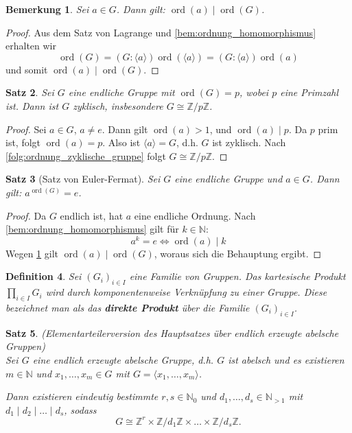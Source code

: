 \documentclass[a4paper, twoside, 11pt, ngerman]{report}
\newcommand{\NN}{\mathds N}
\newcommand{\ZZ}{\mathds Z}
\DeclareMathOperator{\ord}{ord}
\theoremstyle{definistyle}
\newtheorem{satz}{Satz}[section]
\newtheorem{defini}[satz]{Definition}
\newtheorem{bem}[satz]{Bemerkung}
\theoremstyle{remark}
\newcommand{\defn}[1]{\textit{\bfseries #1}}
\begin{document}
\begin{bem}\label{bem:ordnung_teilt_ordG}
Sei $a \in G$. Dann gilt: $\ord(a) \mid \ord(G)$.
\end{bem}

\begin{proof}
Aus dem Satz von Lagrange und \ref{bem:ordnung_homomorphismus} erhalten wir \[\ord(G) = (G : \langle a \rangle) \ord(\langle a\rangle)=(G : \langle a \rangle) \ord(a)\] und somit $\ord(a) \mid \ord(G)$.
\end{proof}

\begin{satz}\label{satz:endliche_zyklische_gruppe}
Sei $G$ eine endliche Gruppe mit $\ord(G) = p$, wobei $p$ eine Primzahl ist. Dann ist $G$ zyklisch, insbesondere $G \cong \ZZ / p \ZZ$.
\end{satz}

\begin{proof}
Sei $a \in G$, $a \neq e$. Dann gilt $\ord(a) > 1$, und $\ord(a) \mid p$. Da $p$ prim ist, folgt $\ord(a) = p$. Also ist $\langle a \rangle = G$, d.h. $G$ ist zyklisch. Nach \ref{folg:ordnung_zyklische_gruppe} folgt $G \cong \ZZ / p \ZZ$.
\end{proof}

\begin{satz}[Satz von Euler-Fermat]\label{satz:euler_fermat}
Sei $G$ eine endliche Gruppe und $a \in G$. Dann gilt: $a^{\ord(G)} = e$.
\end{satz}

\begin{proof}
Da $G$ endlich ist, hat $a$ eine endliche Ordnung. Nach \ref{bem:ordnung_homomorphismus} gilt für $k\in\NN$:
\[
a^k=e\iff \ord(a) \mid k
\]
Wegen \ref{bem:ordnung_teilt_ordG} gilt $\ord(a)\mid \ord(G)$, woraus sich die Behauptung ergibt.
\end{proof}

\begin{defini}\label{defi:produkt_von_gruppen}
Sei $(G_i)_{i \in I}$ eine Familie von Gruppen.
Das kartesische Produkt $\prod_{i \in I} G_i$ wird durch komponentenweise Verknüpfung zu einer Gruppe. 
Diese bezeichnet man als das \defn{direkte Produkt} über die Familie $(G_i)_{i \in I}$.
\end{defini}

\begin{satz}\label{satz:elementarteilersatz}
(Elementarteilerversion des Hauptsatzes über endlich erzeugte abelsche Gruppen) \\
Sei $G$ eine endlich erzeugte abelsche Gruppe, d.h. $G$ ist abelsch und es existieren $m \in \NN$ und $x_1, \dots, x_m \in G$ mit $G = \langle x_1, \dots, x_m \rangle$.

Dann existieren eindeutig bestimmte $r,s \in \NN_0$ und $d_1, \dots, d_s \in \NN_{>1}$ mit $d_1 \mid d_2 \mid \dots \mid d_s$, sodass
\[
G \cong \ZZ^r \times \ZZ / d_1 \ZZ \times \dots \times \ZZ / d_s \ZZ.
\]
\end{satz}
\end{document}
